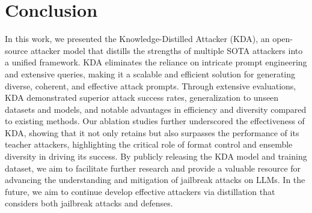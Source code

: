 
\section{Conclusion}



In this work, we presented the Knowledge-Distilled Attacker (KDA), an open-source attacker model that distills the strengths of multiple SOTA attackers into a unified framework. KDA eliminates the reliance on intricate prompt engineering and extensive queries, making it a scalable and efficient solution for generating diverse, coherent, and effective attack prompts. Through extensive evaluations, KDA demonstrated superior attack success rates, generalization to unseen datasets and models, and notable advantages in efficiency and diversity compared to existing methods. Our ablation studies further underscored the effectiveness of KDA, showing that it not only retains but also surpasses the performance of its teacher attackers, highlighting the critical role of format control and ensemble diversity in driving its success. By publicly releasing the KDA model and training dataset, we aim to facilitate further research and provide a valuable resource for advancing the understanding and mitigation of jailbreak attacks on LLMs. In the future, we aim to continue develop effective attackers via distillation that considers both jailbreak attacks and defenses.








